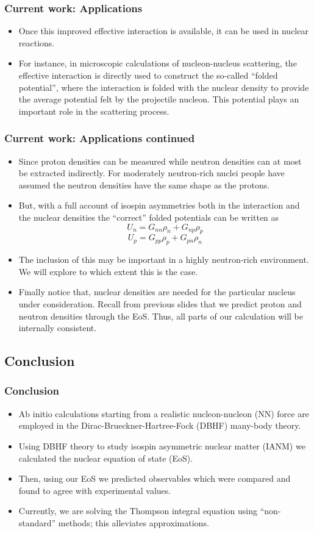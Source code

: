 \documentclass[10pt,serif]{beamer}
\begin{document}
\begin{frame}
\frametitle{Current work: Applications}
\begin{itemize}
\item Once this improved effective interaction is available, it can be used in nuclear reactions.
\item For instance, in microscopic calculations of nucleon-nucleus scattering, the effective interaction is directly used to construct the so-called ``folded potential'', where the interaction is folded with the nuclear density to provide the average potential felt by the projectile nucleon. This potential plays an important role in the scattering process.
\end{itemize}
\end{frame}
\begin{frame}
\frametitle{Current work: Applications continued}
\begin{itemize}
\item Since proton densities can be measured while neutron densities can at most be extracted indirectly. For moderately neutron-rich nuclei people have assumed the neutron densities have the same shape as the protons.
\item But, with a full account of isospin asymmetries both in the interaction and the nuclear densities the ``correct'' folded potentials can be written as
\begin{equation}
U_n = G_{nn} \rho_n + G_{np} \rho_p
\end{equation}
\begin{equation}
U_p = G_{pp} \rho_p + G_{pn} \rho_n
\end{equation}
\item The inclusion of this may be important in a highly neutron-rich environment. We will explore to which extent this is the case.
\item Finally notice that, nuclear densities  are needed for the particular nucleus under consideration. Recall from previous slides that we predict proton and neutron densities through the EoS. Thus, all parts of our calculation will be internally consistent.
\end{itemize}
\end{frame}
\subsection{Conclusion}
\begin{frame}
\frametitle{Conclusion}
\begin{itemize}
\item Ab initio calculations starting from a realistic nucleon-nucleon (NN) force are employed in the Dirac-Brueckner-Hartree-Fock (DBHF) many-body theory.
\item Using DBHF theory to study isospin asymmetric nuclear matter (IANM) we calculated the nuclear equation of state (EoS).
\item Then, using our EoS we predicted observables which were compared and found to agree with experimental values.
\item Currently, we are solving the Thompson integral equation using ``non-standard'' methods; this alleviates approximations.
\end{itemize}
\end{frame}
\end{document}
